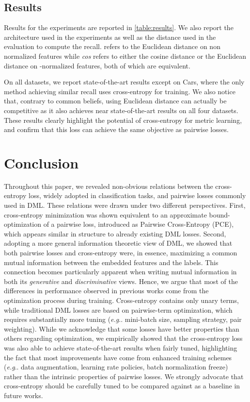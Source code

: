 \documentclass[runningheads]{llncs}
\makeatletter
\DeclareRobustCommand\onedot{\futurelet\@let@token\@onedot}
\def\@onedot{\ifx\@let@token.\else.\null\fi\xspace}
\def\eg{\emph{e.g}\onedot} \def\Eg{\emph{E.g}\onedot}
\makeatother
\begin{document}
\subsection{Results}

Results for the experiments are reported in \autoref{table:results}. We also report the architecture used in the experiments as well as the distance used in the evaluation to compute the recall. \emph{} refers to the Euclidean distance on non normalized features while \emph{cos} refers to either the cosine distance or the Euclidean distance on -normalized features, both of which are equivalent.

On all datasets, we report state-of-the-art results except on Cars, where the only method achieving similar recall uses cross-entropy for training. 
We also notice that, contrary to common beliefs, using Euclidean distance can actually be competitive as it also achieves near state-of-the-art results on all four datasets. These results clearly highlight the potential of cross-entropy for metric learning, and confirm that this loss can achieve the same objective as pairwise losses.
 \section{Conclusion}

Throughout this paper, we revealed non-obvious relations between the cross-entropy loss, widely adopted in classification tasks, and pairwise losses commonly used in DML. These relations were drawn under two different perspectives. First, cross-entropy minimization was shown equivalent to an approximate bound-optimization of a pairwise loss, introduced as Pairwise Cross-Entropy (PCE), which appears similar in structure to already existing DML losses. Second, adopting a more general information theoretic view of DML, we showed that both pairwise losses and cross-entropy were, in essence, maximizing a common mutual information  between the embedded features and the labels. This connection becomes particularly apparent when writing mutual information in both its \textit{generative} and \textit{discriminative} views. Hence, we argue that most of the differences in performance observed in previous works come from the optimization process during training. Cross-entropy contains only unary terms, while traditional DML losses are based on pairwise-term optimization, which requires substantially more tuning (\eg mini-batch size, sampling strategy, pair weighting).
While we acknowledge that some losses have better properties than others regarding optimization, we empirically showed that the cross-entropy loss was also able to achieve state-of-the-art results when fairly tuned, highlighting the fact that most improvements have come from enhanced training schemes (\eg data augmentation, learning rate policies, batch normalization freeze) rather than the intrinsic properties of pairwise losses.
We strongly advocate that cross-entropy should be carefully tuned to be compared against as a baseline in future works. 
%
 
\end{document}
